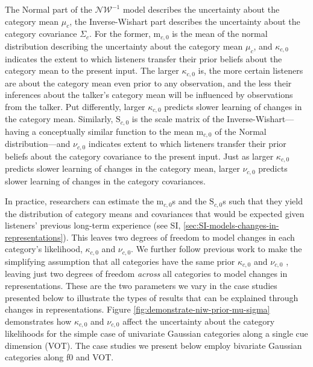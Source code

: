 \documentclass[
  11pt,
  man,floatsintext]{apa6}
\begin{document}
The Normal part of the \(\mathcal{NW^{-1}}\) model describes the uncertainty about the category mean \(\mu_c\), the Inverse-Wishart part describes the uncertainty about the category covariance \(\Sigma_c\). For the former, \(\mathrm{m}_{c,0}\) is the mean of the normal distribution describing the uncertainty about the category mean \(\mu_c\), and \(\kappa_{c,0}\) indicates the extent to which listeners transfer their prior beliefs about the category mean to the present input. The larger \(\kappa_{c,0}\) is, the more certain listeners are about the category mean even prior to any observation, and the less their inferences about the talker's category mean will be influenced by observations from the talker. Put differently, larger \(\kappa_{c,0}\) predicts slower learning of changes in the category mean. Similarly, \(\mathrm{S}_{c,0}\) is the scale matrix of the Inverse-Wishart---having a conceptually similar function to the mean \(\mathrm{m}_{c,0}\) of the Normal distribution---and \(\nu_{c,0}\) indicates extent to which listeners transfer their prior beliefs about the category covariance to the present input. Just as larger \(\kappa_{c,0}\) predicts slower learning of changes in the category mean, larger \(\nu_{c,0}\) predicts slower learning of changes in the category covariances.

In practice, researchers can estimate the \(\mathrm{m}_{c,0}\)s and the \(\mathrm{S}_{c,0}\)s such that they yield the distribution of category means and covariances that would be expected given listeners' previous long-term experience (see SI, \ref{sec:SI-models-changes-in-representations}). This leaves two degrees of freedom to model changes in each category's likelihood, \(\kappa_{c,0}\) and \(\nu_{c,0}\). We further follow previous work to make the simplifying assumption that all categories have the same prior \(\kappa_{c,0}\) and \(\nu_{c,0}\) \autocite{kleinschmidt-jaeger2015,kleinschmidt-jaeger2016cogsci}, leaving just two degrees of freedom \emph{across} all categories to model changes in representations. These are the two parameters we vary in the case studies presented below to illustrate the types of results that can be explained through changes in representations. Figure \ref{fig:demonstrate-niw-prior-mu-sigma} demonstrates how \(\kappa_{c,0}\) and \(\nu_{c,0}\) affect the uncertainty about the category likelihoods for the simple case of univariate Gaussian categories along a single cue dimension (VOT). The case studies we present below employ bivariate Gaussian categories along f0 and VOT.
\end{document}
